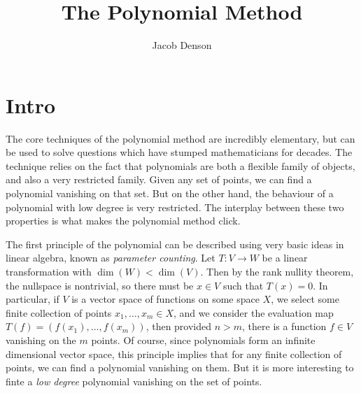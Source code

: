 

\title{The Polynomial Method}
\author{Jacob Denson}




\maketitle

\tableofcontents


\chapter{Intro}

The core techniques of the polynomial method are incredibly elementary, but can be used to solve questions which have stumped mathematicians for decades. The technique relies on the fact that polynomials are both a flexible family of objects, and also a very restricted family. Given any set of points, we can find a polynomial vanishing on that set. But on the other hand, the behaviour of a polynomial with low degree is very restricted. The interplay between these two properties is what makes the polynomial method click.

The first principle of the polynomial can be described using very basic ideas in linear algebra, known as {\it parameter counting}. Let $T: V \to W$ be a linear transformation with $\dim(W) < \dim(V)$. Then by the rank nullity theorem, the nullspace is nontrivial, so there must be $x \in V$ such that $T(x) = 0$. In particular, if $V$ is a vector space of functions on some space $X$, we select some finite collection of points $x_1, \dots, x_m \in X$, and we consider the evaluation map $T(f) = (f(x_1), \dots, f(x_m))$, then provided $n > m$, there is a function $f \in V$ vanishing on the $m$ points. Of course, since polynomials form an infinite dimensional vector space, this principle implies that for any finite collection of points, we can find a polynomial vanishing on them. But it is more interesting to finte a {\it low degree} polynomial vanishing on the set of points.

